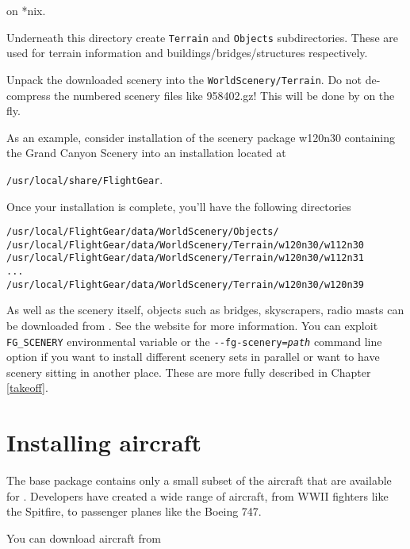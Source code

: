 \noindent on *nix.

Underneath this directory create \texttt{Terrain} and \texttt{Objects} subdirectories. These are used for terrain information and buildings/bridges/structures respectively.

Unpack the downloaded scenery into the \texttt{WorldScenery/Terrain}. Do not de-compress the numbered
scenery files like 958402.gz! This will be done by \FlightGear{} on the fly. 

As an example, consider installation of the scenery package w120n30 containing the Grand
Canyon Scenery into an installation located at 

\texttt{/usr/local/share/FlightGear}.

Once your installation is complete, you'll have the following directories
\medskip

\begin{verbatim}
/usr/local/FlightGear/data/WorldScenery/Objects/
/usr/local/FlightGear/data/WorldScenery/Terrain/w120n30/w112n30
/usr/local/FlightGear/data/WorldScenery/Terrain/w120n30/w112n31
...
/usr/local/FlightGear/data/WorldScenery/Terrain/w120n30/w120n39
\end{verbatim}
\medskip

As well as the scenery itself, objects such as bridges, skyscrapers, radio masts can be downloaded
from . See the website for more information.
\medskip
You can exploit \texttt{FG\_SCENERY} environmental variable or the \texttt{-$ $-fg-scenery={\it path}} command line option if you want to install different scenery sets in parallel or want to have scenery sitting in another place. These are more fully described in Chapter \ref{takeoff}.

\section{Installing aircraft}\label{install_aircraft}

The base \FlightGear{} package contains only a small subset of the aircraft that are available for \FlightGear{}. 
Developers have created a wide range of aircraft, from WWII fighters like the Spitfire, to passenger planes like the Boeing 747.

You can download aircraft from 

